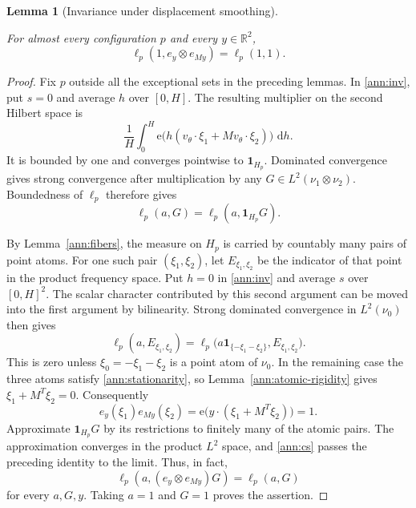 \documentclass[11pt]{amsart}
\newcommand{\R}{\mathbb R}
\newcommand{\dd}{\,\mathrm d}
\newcommand{\one}{\mathbf 1}
\newcommand{\e}{\mathrm e}
\newtheorem{lemma}[theorem]{Lemma}
\theoremstyle{definition}
\theoremstyle{remark}
\numberwithin{equation}{section}
\providecommand{\lean}[1]{}
\providecommand{\leanok}{}
\begin{document}
\begin{lemma}[Invariance under displacement smoothing]
\label{ann:displacement}
\lean{Auto.ann_displacement}
\leanok
For almost every configuration $p$ and every $y\in\R^2$,
\[
 \ell_p(1,e_y\otimes e_{My})=\ell_p(1,1).
\]
\end{lemma}
\begin{proof}
Fix $p$ outside all the exceptional sets in the preceding lemmas.
In \eqref{ann:inv}, put $s=0$ and average $h$ over $[0,H]$.
The resulting multiplier on the second Hilbert space is
\[
 \frac1H\int_0^H
 \e\bigl(h(v_\theta\cdot\xi_1+Mv_\theta\cdot\xi_2)\bigr)\,\dd h.
\]
It is bounded by one and converges pointwise to $\one_{H_p}$.
Dominated convergence gives strong convergence after multiplication
by any $G\in L^2(\nu_1\otimes\nu_2)$.
Boundedness of $\ell_p$ therefore gives
\begin{equation}\label{ann:restrict-H}
 \ell_p(a,G)=\ell_p(a,\one_{H_p}G).
\end{equation}

By Lemma~\ref{ann:fibers}, the measure on $H_p$ is carried by
countably many pairs of point atoms. For one such pair
$(\xi_1,\xi_2)$, let $E_{\xi_1,\xi_2}$ be the indicator of that
point in the product frequency space. Put $h=0$ in
\eqref{ann:inv} and average $s$ over $[0,H]^2$.
The scalar character contributed by this second argument can be
moved into the first argument by bilinearity. Strong dominated
convergence in $L^2(\nu_0)$ then gives
\[
 \ell_p(a,E_{\xi_1,\xi_2})
 =\ell_p\bigl(a\one_{\{-\xi_1-\xi_2\}},E_{\xi_1,\xi_2}\bigr).
\]
This is zero unless $\xi_0=-\xi_1-\xi_2$ is a point atom of
$\nu_0$. In the remaining case the three atoms satisfy
\eqref{ann:stationarity}, so Lemma~\ref{ann:atomic-rigidity}
gives $\xi_1+M^T\xi_2=0$. Consequently
\[
 e_y(\xi_1)e_{My}(\xi_2)
 =\e\bigl(y\cdot(\xi_1+M^T\xi_2)\bigr)=1.
\]
Approximate $\one_{H_p}G$ by its restrictions to finitely many
of the atomic pairs. The approximation converges in the product
$L^2$ space, and \eqref{ann:cs} passes the preceding identity to
the limit. Thus, in fact,
\[
 \ell_p(a,(e_y\otimes e_{My})G)=\ell_p(a,G)
\]
for every $a,G,y$. Taking $a=1$ and $G=1$ proves the assertion.
\end{proof}
\end{document}
